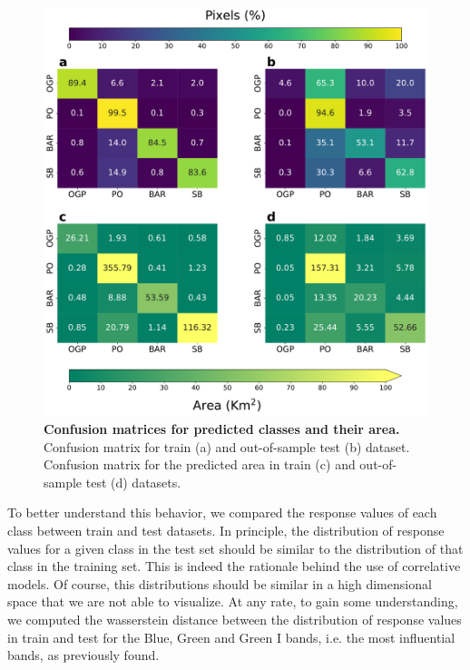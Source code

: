 \begin{figure}[H]
    \centering
    \includegraphics[width=\textwidth]{Figures/Confusion_matrix.pdf}
    \caption[Confusion matrices for predicted classes and their
        area]{\textbf{Confusion matrices for predicted classes and their area.}
        Confusion
        matrix for train (a) and out-of-sample test (b)
        dataset. Confusion matrix for the predicted area in train (c) and
        out-of-sample
        test (d) datasets.}
    \label{fig:confusion_matrix}
\end{figure}

To better understand this behavior, we compared the response values of each
class between train and test datasets. In principle, the distribution of
response values for a given class in the test set should be similar to the
distribution of that class in the training set. This is indeed the rationale
behind the use of correlative models. Of course, this distributions should be
similar in a high dimensional space that we are not able to visualize. At any
rate, to gain some understanding, we computed the wasserstein distance between
the distribution of response values in train and test for the Blue, Green and
Green I bands, i.e. the most influential bands, as previously found.

